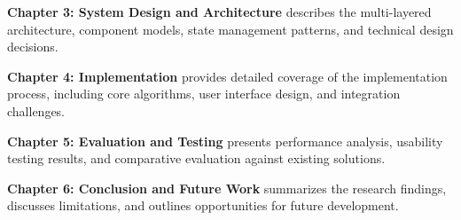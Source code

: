 \documentclass[oneside,11pt]{book}
\begin{document}
\textbf{Chapter 3: System Design and Architecture} describes the multi-layered architecture, component models, state management patterns, and technical design decisions.

\textbf{Chapter 4: Implementation} provides detailed coverage of the implementation process, including core algorithms, user interface design, and integration challenges.

\textbf{Chapter 5: Evaluation and Testing} presents performance analysis, usability testing results, and comparative evaluation against existing solutions.

\textbf{Chapter 6: Conclusion and Future Work} summarizes the research findings, discusses limitations, and outlines opportunities for future development.

\printglossaries
\end{document}

